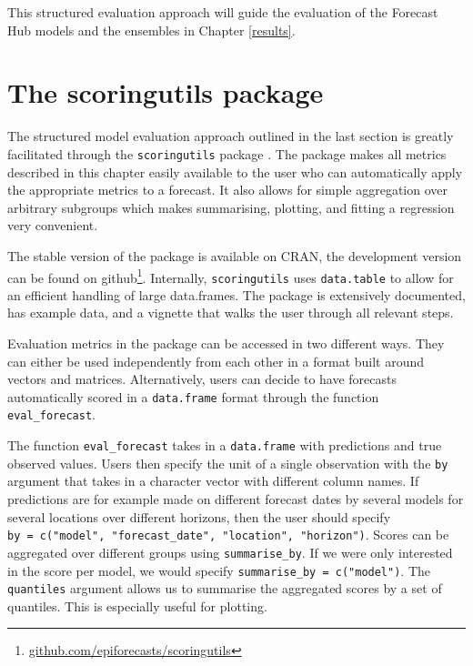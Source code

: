 \documentclass[
]{book}
\begin{document}
This structured evaluation approach will guide the evaluation of the Forecast Hub models and the ensembles in Chapter \ref{results}.

\hypertarget{the-scoringutils-package}{%
\section{The scoringutils package}\label{the-scoringutils-package}}

The structured model evaluation approach outlined in the last section is greatly facilitated through the \texttt{scoringutils} package \citep{R-scoringutils}. The package makes all metrics described in this chapter easily available to the user who can automatically apply the appropriate metrics to a forecast. It also allows for simple aggregation over arbitrary subgroups which makes summarising, plotting, and fitting a regression very convenient.

The stable version of the package is available on CRAN, the development version can be found on github\footnote{\href{https://github.com/epiforecasts/scoringutils}{github.com/epiforecasts/scoringutils}}. Internally, \texttt{scoringutils} uses \texttt{data.table} \citep{R-data.table} to allow for an efficient handling of large data.frames. The package is extensively documented, has example data, and a vignette that walks the user through all relevant steps.

Evaluation metrics in the package can be accessed in two different ways. They can either be used independently from each other in a format built around vectors and matrices. Alternatively, users can decide to have forecasts automatically scored in a \texttt{data.frame} format through the function \texttt{eval\_forecast}.

The function \texttt{eval\_forecast} takes in a \texttt{data.frame} with predictions and true observed values. Users then specify the unit of a single observation with the \texttt{by} argument that takes in a character vector with different column names. If predictions are for example made on different forecast dates by several models for several locations over different horizons, then the user should specify \texttt{by\ =\ c("model",\ "forecast\_date",\ "location",\ "horizon")}. Scores can be aggregated over different groups using \texttt{summarise\_by}. If we were only interested in the score per model, we would specify \texttt{summarise\_by\ =\ c("model")}. The \texttt{quantiles} argument allows us to summarise the aggregated scores by a set of quantiles. This is especially useful for plotting.
\end{document}

